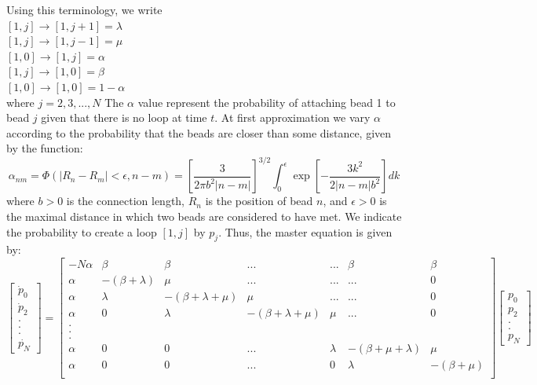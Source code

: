\documentclass[12pt]{article}
\begin{document}
Using this terminology, we write\\
$[1,j]\rightarrow [1,j+1] = \lambda$\\
$[1,j]\rightarrow [1,j-1] = \mu$\\
$[1,0]\rightarrow [1,j] = \alpha$\\
$[1,j]\rightarrow [1,0] = \beta$\\
$[1,0]\rightarrow [1,0] = 1-\alpha$\\
where $j=2,3,...,N$
The $\alpha$ value represent the probability of attaching bead 1 to bead $j$ given that there is no loop at time $t$. At first approximation we vary $\alpha$ according to the probability that the beads are closer than some distance, given by the function:
\begin{equation*}
\alpha_{nm}=\Phi(|R_n-R_m|<\epsilon,n-m)=\left[\frac{3}{2\pi b^2|n-m|} \right]^{3/2}\int_0^\epsilon{\exp{\left[-\frac{3k^2}{2|n-m|b^2}\right]dk}}
\end{equation*}
where $b>0$ is the connection length, $R_n$ is the position of bead $n$, and $\epsilon>0$ is the maximal distance in which two beads are considered to have met. 
We indicate the probability to create a loop $[1,j]$ by $p_j$.
Thus, the master equation is given by:
\scriptsize{
\begin{equation*}
\left[\begin{matrix}
\dot{p}_0\\
\dot{p}_2\\
.\\
.\\
.\\
\dot{p_N}
\end{matrix}\right] = 
\left[\begin{matrix}
-N\alpha &\beta             & \beta & ... &... &\beta&\beta\\
\alpha   & -(\beta+\lambda) & \mu   & ... &... &... & 0 \\
\alpha   & \lambda          & -(\beta+\lambda +\mu) &\mu &... &...& 0\\
\alpha   & 0                & \lambda               & -(\beta+\lambda+\mu)&\mu&...& 0\\
.\\
.\\
.\\
\alpha   & 0                & 0 &...& \lambda               & -(\beta+\mu+\lambda)&\mu\\
\alpha   & 0                & 0 &...&  0                    & \lambda & -(\beta+\mu)\\
\end{matrix}\right] 
\left[
\begin{matrix}
p_0\\
p_2\\
.\\
.\\
p_N
\end{matrix}
\right]
\end{equation*}
}
\end{document}
